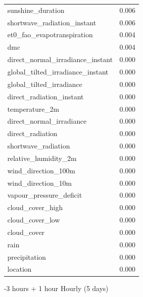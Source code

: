 \begin{table}[H]
\begin{tabular}{lc}
		sunshine\_duration                      & 0.006       \\ 
		shortwave\_radiation\_instant          & 0.006       \\ 
		et0\_fao\_evapotranspiration       & 0.004       \\ 
		dmc                                        & 0.004       \\ 
		direct\_normal\_irradiance\_instant     & 0.000       \\ 
		global\_tilted\_irradiance\_instant      & 0.000       \\ 
		global\_tilted\_irradiance             & 0.000       \\ 
		direct\_radiation\_instant             & 0.000       \\ 
		temperature\_2m                       & 0.000       \\ 
		direct\_normal\_irradiance             & 0.000       \\ 
		direct\_radiation                     & 0.000       \\ 
		shortwave\_radiation                  & 0.000       \\ 
		relative\_humidity\_2m                & 0.000       \\ 
		wind\_direction\_100m                 & 0.000       \\ 
		wind\_direction\_10m                  & 0.000       \\ 
		vapour\_pressure\_deficit            & 0.000       \\ 
		cloud\_cover\_high                    & 0.000       \\ 
		cloud\_cover\_low                     & 0.000       \\ 
		cloud\_cover                         & 0.000       \\ 
		rain                                & 0.000       \\ 
		precipitation                       & 0.000       \\ 
		location                                & 0.000       \\ 
	\end{tabular}
\end{table}

-3 hours + 1 hour Hourly (5 days)

